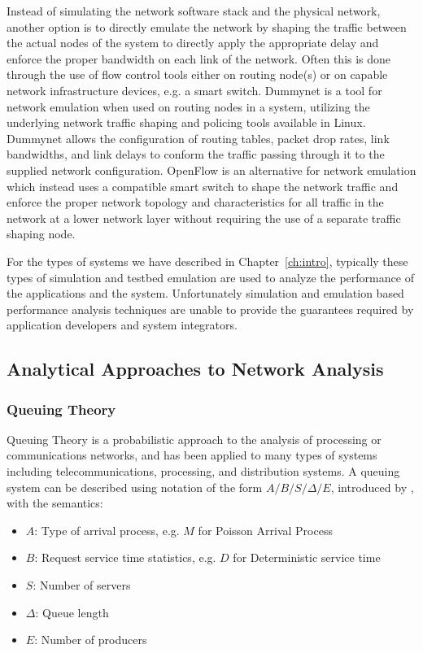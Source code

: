 Instead of simulating the network software stack and the physical
network, another option is to directly emulate the network by shaping
the traffic between the actual nodes of the system to directly apply
the appropriate delay and enforce the proper bandwidth on each link of
the network.  Often this is done through the use of flow control tools
either on routing node(s) or on capable network infrastructure
devices, e.g. a smart switch.
Dummynet\cite{dummynet1997}\cite{dummynetRevisited2010} is a tool for
network emulation when used on routing nodes in a system, utilizing
the underlying network traffic shaping and policing tools available in
Linux.  Dummynet allows the configuration of routing tables, packet
drop rates, link bandwidths, and link delays to conform the traffic
passing through it to the supplied network configuration.
OpenFlow\cite{openflow2009openflow} is an alternative for network
emulation which instead uses a compatible smart switch to shape the
network traffic and enforce the proper network topology and
characteristics for all traffic in the network at a lower network
layer without requiring the use of a separate traffic shaping node.

For the types of systems we have described in Chapter~\ref{ch:intro},
typically these types of simulation and testbed emulation are used to
analyze the performance of the applications and the system.
Unfortunately simulation and emulation based performance analysis
techniques are unable to provide the guarantees required by
application developers and system integrators.

\subsection{Analytical Approaches to Network Analysis}
\label{subsec:related_part1_analytics}

\subsubsection{Queuing Theory}
Queuing Theory\cite{QT_Kendall1953}\cite{QT_Giambene2005} is a
probabilistic approach to the analysis of processing or communications
networks, and has been applied to many types of systems including
telecommunications, processing, and distribution systems.  A queuing
system can be described using notation of the form $A/B/S/\Delta/E$,
introduced by \cite{QT_Kendall1953}, with the semantics:

\begin{itemize}
\item $A$: Type of arrival process, e.g. $M$ for Poisson Arrival Process
\item $B$: Request service time statistics, e.g. $D$ for Deterministic service time
\item $S$: Number of servers
\item $\Delta$: Queue length
\item $E$: Number of producers
\end{itemize}

